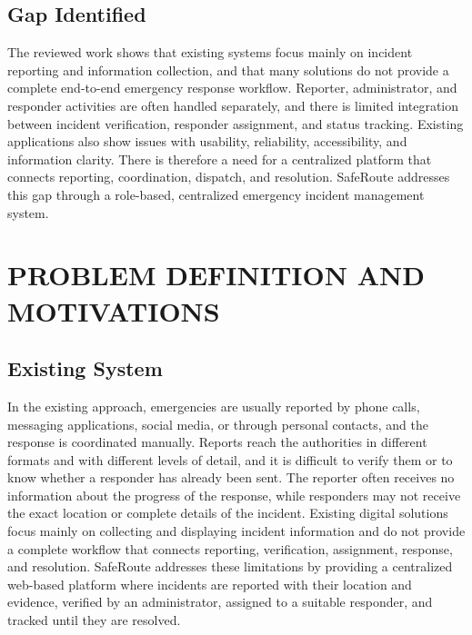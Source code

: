 \documentclass[a4paper,12pt]{report}
\begin{document}
	\section{Gap Identified}
	
	\hspace{1cm}The reviewed work shows that existing systems focus mainly on incident reporting and information collection, and that many solutions do not provide a complete end-to-end emergency response workflow. Reporter, administrator, and responder activities are often handled separately, and there is limited integration between incident verification, responder assignment, and status tracking. Existing applications also show issues with usability, reliability, accessibility, and information clarity. There is therefore a need for a centralized platform that connects reporting, coordination, dispatch, and resolution. SafeRoute addresses this gap through a role-based, centralized emergency incident management system.
	
	\clearpage
	
	\chapter{PROBLEM DEFINITION AND MOTIVATIONS}
	
	\section{Existing System}
	
	In the existing approach, emergencies are usually reported by phone calls, messaging applications, social media, or through personal contacts, and the response is coordinated manually. Reports reach the authorities in different formats and with different levels of detail, and it is difficult to verify them or to know whether a responder has already been sent. The reporter often receives no information about the progress of the response, while responders may not receive the exact location or complete details of the incident. Existing digital solutions focus mainly on collecting and displaying incident information and do not provide a complete workflow that connects reporting, verification, assignment, response, and resolution. SafeRoute addresses these limitations by providing a centralized web-based platform where incidents are reported with their location and evidence, verified by an administrator, assigned to a suitable responder, and tracked until they are resolved.
	
\end{document}
